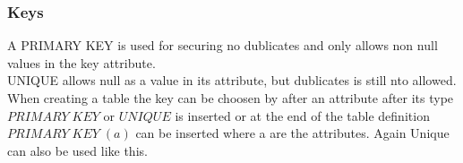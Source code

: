 \documentclass[12pt, a4paper]{article}
\begin{document}
			\subsubsection{Keys}
				A PRIMARY KEY is used for securing no dublicates and only allows non null values in the key attribute.\\
				UNIQUE allows null as a value in its attribute, but dublicates is still nto allowed.\\
				When creating a table the key can be choosen by after an attribute after its type $PRIMARY\; KEY$ or $UNIQUE$ is inserted or at the end of the table definition $PRIMARY\; KEY\; (a)$ can be inserted where a are the attributes. Again Unique can also be used like this.
			
					
\end{document}
